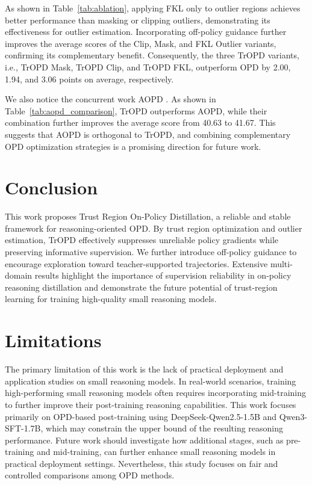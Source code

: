 \documentclass{article} %
\renewcommand{\cite}[1]{\citep{#1}}
\begin{document}
As shown in Table~\ref{tab:ablation}, applying FKL only to outlier regions achieves better performance than masking or clipping outliers, demonstrating its effectiveness for outlier estimation. Incorporating off-policy guidance further improves the average scores of the Clip, Mask, and FKL Outlier variants, confirming its complementary benefit. Consequently, the three TrOPD variants, i.e., TrOPD Mask, TrOPD Clip, and TrOPD FKL, outperform OPD by 2.00, 1.94, and 3.06 points on average, respectively.

We also notice the concurrent work AOPD \cite{jia2026asymmetric}. As shown in Table~\ref{tab:aopd_comparison}, TrOPD outperforms AOPD, while their combination further improves the average score from 40.63 to 41.67. This suggests that AOPD is orthogonal to TrOPD, and combining complementary OPD optimization strategies is a promising direction for future work.





\section{Conclusion}
This work proposes Trust Region On-Policy Distillation, a reliable and stable framework for reasoning-oriented OPD. By trust region optimization and outlier estimation, TrOPD effectively suppresses unreliable policy gradients while preserving informative supervision. 
We further introduce off-policy guidance to encourage exploration toward teacher-supported trajectories. 
Extensive multi-domain results highlight the importance of supervision reliability in on-policy reasoning distillation and demonstrate the future potential of trust-region learning for training high-quality small reasoning models.

\section*{Limitations}

The primary limitation of this work is the lack of practical deployment and application studies on small reasoning models. In real-world scenarios, training high-performing small reasoning models often requires incorporating mid-training to further improve their post-training reasoning capabilities. This work focuses primarily on OPD-based post-training using DeepSeek-Qwen2.5-1.5B and Qwen3-SFT-1.7B, which may constrain the upper bound of the resulting reasoning performance. Future work should investigate how additional stages, such as pre-training and mid-training, can further enhance small reasoning models in practical deployment settings. Nevertheless, this study focuses on fair and controlled comparisons among OPD methods.
\end{document}
